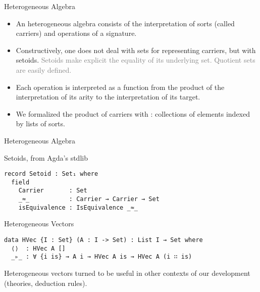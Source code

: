 \documentclass[11pt]{beamer}
\let\emph\relax
\newcommand{\point}[1]{\textcolor{gray}{#1}}
\begin{document}
\begin{frame}[fragile]{Heterogeneous Algebra}
  \begin{itemize}[<+->]
    \setlength\itemsep{1em}
  \item An heterogeneous algebra consists of the interpretation of sorts (called carriers) and operations of
    a signature.

  \item Constructively, one does not deal with sets for representing carriers, but with setoids.
    \point{Setoids make explicit the equality of its underlying set.
      Quotient sets are easily defined.}
    
  \item Each operation is interpreted as a function from
    the product of the interpretation of its arity to the
    interpretation of its target.
    
  \item We formalized the product of carriers with
    \emph{heterogeneous vectors}: collections of elements indexed by lists
    of sorts.
  \end{itemize}
\end{frame}

\begin{frame}[fragile]{Heterogeneous Algebra}
  \begin{block}{Setoids, from Agda's stdlib}
    \begin{verbatim}
record Setoid : Set₁ where
  field
    Carrier       : Set 
    _≈_           : Carrier → Carrier → Set
    isEquivalence : IsEquivalence _≈_
      \end{verbatim}
  \end{block}
  \pause
  \begin{block}{Heterogeneous Vectors}
    \begin{verbatim}
data HVec {I : Set} (A : I -> Set) : List I → Set where
  ⟨⟩  : HVec A []
  _▹_ : ∀ {i is} → A i → HVec A is → HVec A (i ∷ is)
       \end{verbatim}
     \end{block}
     Heterogeneous vectors turned to be useful in other contexts of
     our development (theories, deduction rules).
\end{frame}
\end{document}
